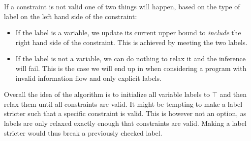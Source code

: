 If a constraint is not valid one of two things will happen, based on the type of label on the left hand side of the constraint:
\begin{itemize}
  \item If the label is a variable, we update its current upper bound to \textit{include} the right hand side of the constraint.
  This is achieved by meeting the two labels.
  \item If the label is not a variable, we can do nothing to relax it and the inference will fail.
  This is the case we will end up in when considering a program with invalid information flow and only explicit labels.
\end{itemize}

Overall the idea of the algorithm is to initialize all variable labels to $\top$ and then relax them until all constraints are valid.
It might be tempting to make a label stricter such that a specific constraint is valid.
This is however not an option, as labels are only relaxed exactly enough that constraints are valid.
Making a label stricter would thus break a previously checked label.

